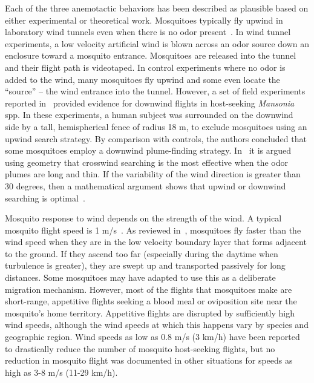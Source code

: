 \documentclass[10pt]{article}
\begin{document}
Each of the three anemotactic behaviors has been described as plausible based on either experimental or theoretical work.
Mosquitoes typically fly upwind in laboratory wind tunnels even when there is no odor present~\cite{Dekker2005,Gibson1999}. In wind tunnel experiments, a low velocity artificial wind is blown across an odor source down an enclosure toward a mosquito entrance. Mosquitoes are released into the tunnel and their flight path is videotaped. In control experiments where no odor is added to the wind, many mosquitoes fly upwind and some even locate the ``source'' -- the wind entrance into the tunnel.  
However, a set of field experiments reported in~\cite{Gillies1974} provided evidence for downwind flights in host-seeking
 \textit{Mansonia} spp. In these experiments, a human subject was surrounded on the downwind side by a tall, hemispherical fence of radius 18 m, to exclude mosquitoes using an upwind search strategy. By comparison with controls, the authors concluded that some mosquitoes employ a downwind plume-finding strategy.  
In~\cite{Dusenbery1989} it is argued using geometry that crosswind searching is the most effective when the odor plumes are long and thin.  If the variability of the wind direction is greater than 30 degrees, then a mathematical argument shows that upwind or downwind searching is optimal~\cite{Sabelis1984}.  

Mosquito response to wind depends on the strength of the wind. A typical mosquito flight speed is 1 m/s~\cite{Clements1999,Gibson1999}. As reviewed in~\cite{Service1980}, mosquitoes fly faster than the wind speed when they are in the low velocity boundary layer that forms adjacent to the ground. If they ascend too far (especially during the daytime when turbulence is greater), they are swept up and transported passively for long distances.  Some mosquitoes may have adapted to use this as a deliberate migration mechanism. However, most of the flights that mosquitoes make are 
short-range, appetitive flights seeking a blood meal or oviposition site near the mosquito's home territory. Appetitive flights are disrupted by sufficiently high wind speeds, although the wind speeds at which this happens vary by species and geographic region. Wind speeds as low as 0.8 m/s (3 km/h) have been reported to drastically reduce the number of mosquito host-seeking flights, but no reduction in mosquito flight was documented in other situations for speeds as high as 3-8 m/s (11-29 km/h).


\end{document}
